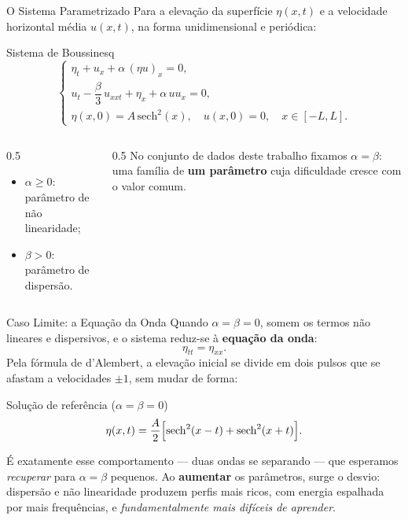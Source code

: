 \begin{frame}{O Sistema Parametrizado}
  Para a elevação da superfície $\eta(x,t)$ e a velocidade horizontal média $u(x,t)$, na
  forma unidimensional e periódica:
  \begin{block}{Sistema de Boussinesq}
    \begin{equation*}
      \begin{cases}
        \eta_t + u_x + \alpha\,(\eta u)_x = 0, \\[4pt]
        u_t - \dfrac{\beta}{3}\,u_{xxt} + \eta_x + \alpha\,u u_x = 0, \\[4pt]
        \eta(x,0) = A\,\mathrm{sech}^2(x), \quad u(x,0) = 0, \quad x \in [-L,L].
      \end{cases}
    \end{equation*}
  \end{block}

  \begin{columns}[T,totalwidth=\textwidth]
    \begin{column}{0.5\textwidth}
      \begin{itemize}
        \item $\alpha \geq 0$: parâmetro de \alert{não linearidade};
        \item $\beta > 0$: parâmetro de \alert{dispersão}.
      \end{itemize}
    \end{column}
    \begin{column}{0.5\textwidth}
      No conjunto de dados deste trabalho fixamos $\alpha = \beta$: uma família de
      \textbf{um parâmetro} cuja dificuldade cresce com o valor comum.
    \end{column}
  \end{columns}
\end{frame}

\begin{frame}{Caso Limite: a Equação da Onda}
  Quando $\alpha = \beta = 0$, somem os termos não lineares e dispersivos, e o sistema
  reduz-se à \textbf{equação da onda}:
  \begin{equation*}
    \eta_{tt} = \eta_{xx}.
  \end{equation*}
  Pela fórmula de d'Alembert, a elevação inicial se divide em \alert{dois pulsos que se
  afastam} a velocidades $\pm 1$, sem mudar de forma:
  \begin{block}{Solução de referência ($\alpha=\beta=0$)}
    \begin{equation*}
      \eta(x,t) = \frac{A}{2}\Bigl[\mathrm{sech}^2(x-t) + \mathrm{sech}^2(x+t)\Bigr].
    \end{equation*}
  \end{block}

  \begin{information}[Intuição]
    É exatamente esse comportamento --- duas ondas se separando --- que esperamos
    \emph{recuperar} para $\alpha=\beta$ pequenos. Ao \textbf{aumentar} os parâmetros, surge
    o desvio: dispersão e não linearidade produzem perfis mais ricos, com energia
    espalhada por mais frequências, e \emph{fundamentalmente mais difíceis de aprender}.
  \end{information}
\end{frame}
